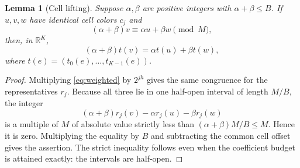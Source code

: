 \documentclass[11pt]{article}
\newtheorem{lemma}[theorem]{Lemma}
\theoremstyle{remark}\newtheorem{remark}[theorem]{Remark}
\newcommand{\R}{\mathbb R}
\begin{document}
\begin{lemma}[Cell lifting]\label{lem:cell}
Suppose $\alpha,\beta$ are positive integers with $\alpha+\beta\le B$. If $u,v,w$ have identical cell colors $c_j$ and
\begin{equation}\label{eq:weighted}
 (\alpha+\beta)v\equiv \alpha u+\beta w\pmod M,
\end{equation}
then, in $\R^K$,
\[
 (\alpha+\beta)t(v)=\alpha t(u)+\beta t(w),
\]
where $t(e)=(t_0(e),\ldots,t_{K-1}(e))$.
\end{lemma}
\begin{proof}
Multiplying \eqref{eq:weighted} by $2^{jh}$ gives the same congruence for the representatives $r_j$. Because all three lie in one half-open interval of length $M/B$, the integer
\[
 (\alpha+\beta)r_j(v)-\alpha r_j(u)-\beta r_j(w)
\]
is a multiple of $M$ of absolute value strictly less than $(\alpha+\beta)M/B\le M$. Hence it is zero. Multiplying the equality by $B$ and subtracting the common cell offset gives the assertion. The strict inequality follows even when the coefficient budget is attained exactly: the intervals are half-open.
\end{proof}
\end{document}
